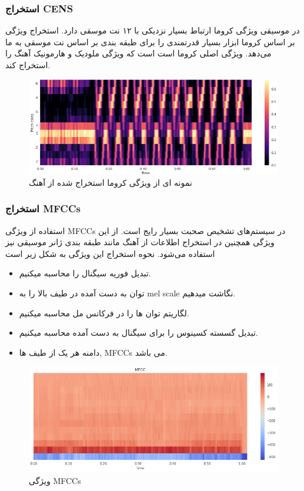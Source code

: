 \documentclass[conference]{IEEEtran}
\begin{document}
    \subsubsection{ استخراج CENS      }
    در موسیقی ویژگی کروما ارتباط بسیار نزدیکی با ۱۲ نت موسقی دارد. استخراج ویژگی بر اساس کروما ابزار بسیار قدرتمندی را برای طبقه بندی بر اساس نت موسقی به ما می‌دهد. ویژگی اصلی کروما است است که ویژگی ملودیک و هارمونیک آهنگ را استخراج کند.
\begin{figure}[h!]
\includegraphics[width=\linewidth]{1.png}
      \caption{نمونه ای از ویژگی کروما استخراج شده از آهنگ }
      \label{fig:fig 1}
    \end{figure}
    \subsubsection{استخراج MFCCs}
    استفاده از ویژگی MFCCs  در سیستم‌های تشخیص صحبت   بسیار رایج است. از این ویژگی همچنین در  استخراج اطلاعات از آهنگ    مانند طبقه بندی ژانر موسیقی نیز استفاده می‌شود. 
    نحوه استخراج این ویژگی به شکل زیر است
    \begin{itemize}
    \item  تبدیل فوریه سیگنال را محاسبه میکنیم.
    \item توان به دست آمده در طیف بالا را به mel scale نگاشت میدهیم.
    \item لگاریتم توان ها را در فرکانس مل    محاسبه میکنیم. 
    \item تبدیل گسسته کسینوس را برای سیگنال به دست آمده محاسبه میکنیم. 
    \item دامنه هر یک از طیف ها, MFCCs می باشد.
    
    \end{itemize}
    \begin{figure}[h!]
\includegraphics[width=\linewidth]{3.png}
      \caption{  ویژگی MFCCs }
      \label{fig:fig 1}
    \end{figure}
\end{document}
